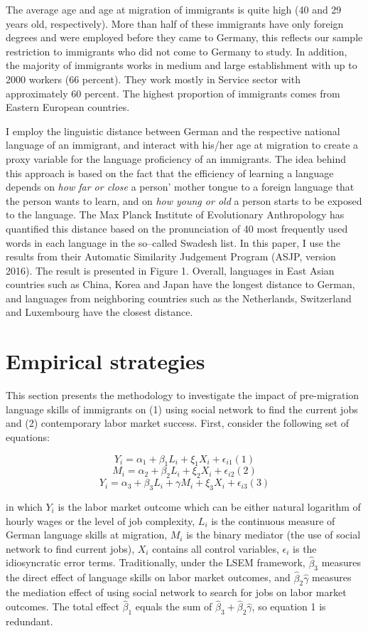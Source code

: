 \documentclass[12pt,a4paper]{article}
\begin{document}
The average age and age at migration of immigrants is quite high (40 and 29 years old, respectively). More than half of these immigrants have only foreign degrees and were employed before they came to Germany, this reflects our sample restriction to immigrants who did not come to Germany to study. In addition, the majority of immigrants works in medium and large establishment with up to 2000 workers (66 percent). They work mostly in Service sector with approximately 60 percent. The highest proportion of immigrants comes from Eastern European countries.

I employ the linguistic distance between German and the respective national language of an immigrant, and interact with his/her age at migration to create a proxy variable for the language proficiency of an immigrants. The idea behind this approach is based on the fact that the efficiency of learning a language depends on \textit{how far or close} a person' mother tongue to a foreign language that the person wants to learn, and on \textit{how young or old} a person starts to be exposed to the language. The Max Planck Institute of Evolutionary Anthropology has quantified this distance based on the pronunciation of 40 most frequently used words in each language in the so--called Swadesh list. In this paper, I use the results from their Automatic Similarity Judgement Program (ASJP, version 2016). The result is presented in Figure 1. Overall, languages in East Asian countries such as China, Korea and Japan have the longest distance to German, and languages from neighboring countries such as the Netherlands, Switzerland and Luxembourg have the closest distance.

\section{Empirical strategies}

This section presents the methodology to investigate the impact of pre-migration language skills of immigrants on (1) using social network to find the current jobs and (2) contemporary labor market success. First, consider the following set of equations:

$$Y_{i} = \alpha_{1} + \beta_{1}L_{i} + \xi_{1}X_{i} + \epsilon_{i1} (1)$$
$$M_{i} = \alpha_{2} + \beta_{2}L_{i} + \xi_{2}X_{i} + \epsilon_{i2} (2) $$
$$Y_{i} = \alpha_{3} + \beta_{3}L_{i} + \gamma M_{i} + \xi_{3}X_{i} + \epsilon_{i3} (3)$$

in which $Y_{i}$ is the labor market outcome which can be either natural logarithm of hourly wages or the level of job complexity, $L_{i}$ is the continuous measure of German language skills at migration, $M_{i}$ is the binary mediator (the use of social network to find current jobs), $X_{i}$ contains all control variables, $\epsilon_{i}$ is the idiosyncratic error terms. Traditionally, under the LSEM framework, $\hat \beta_{3}$ measures the direct effect of language skills on labor market outcomes, and $\hat \beta_{2}\hat \gamma$ measures the mediation effect of using social network to search for jobs on labor market outcomes. The total effect $\hat \beta_{1}$ equals the sum of $\hat \beta_{3} + \hat \beta_{2}\hat \gamma$, so equation 1 is redundant. 
\end{document}
